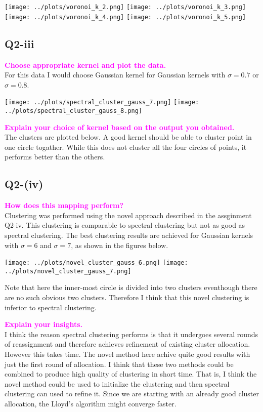 \texttt{[image: ../plots/voronoi\_k\_2.png]}
\texttt{[image: ../plots/voronoi\_k\_3.png]}
\texttt{[image: ../plots/voronoi\_k\_4.png]}
\texttt{[image: ../plots/voronoi\_k\_5.png]}

\subsection*{Q2-iii}
\textcolor{magenta}{\textbf{Choose appropriate kernel and plot the data.}}\\

For this data I would choose Gaussian kernel for Gaussian kernels with $\sigma = 0.7$ or $\sigma = 0.8$. 

\centering
\texttt{[image: ../plots/spectral\_cluster\_gauss\_7.png]}
\texttt{[image: ../plots/spectral\_cluster\_gauss\_8.png]}
\raggedright

\textcolor{magenta}{\textbf{Explain your choice of kernel based on the output you obtained.}}\\

The clusters are plotted below. A good kernel should be able to cluster point in one circle togather. While this does not cluster all the four circles of points, it performs better than the others. 

\subsection*{Q2-(iv)}
\textbf{\textcolor{magenta}{How does this mapping perform?}}\\
Clustering was performed using the novel approach described in the assginment Q2-iv. This clustering is comparable to spectral clustering but not as good as spectral clustering. The best clustering results are achieved for Gaussian kernels with $\sigma = 6$ and $\sigma = 7$, as shown in the figures below.



\centering
\texttt{[image: ../plots/novel\_cluster\_gauss\_6.png]}
\texttt{[image: ../plots/novel\_cluster\_gauss\_7.png]}
\raggedright

Note that here the inner-most circle is divided into two clusters eventhough there are no such obvious two clusters. Therefore I think that this novel clustering is inferior to spectral clustering.

\textbf{\textcolor{magenta}{Explain your insights.}}\\
I think the reason spectral clustering performs is that it undergoes several rounds of reassignment and therefore achieves refinement of existing cluster allocation. However this takes time. The novel method here achive quite good results with just the first round of allocation. I think that these two methods could be combined to produce high quality of clustering in short time. That is, I think the novel method could be used to initialize the clustering and then spectral clustering can used to refine it. Since we are starting with an already good cluster allocation, the Lloyd's algorithm might converge faster.



